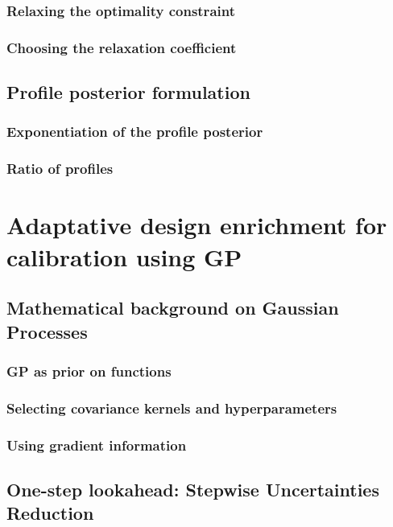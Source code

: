 \documentclass[11pt]{article}
\begin{document}
\subsubsection{Relaxing the optimality constraint}
\label{sec:orge09cf05}
\subsubsection{Choosing the relaxation coefficient}
\label{sec:orgfc77c5f}

\subsection{Profile posterior formulation}
\label{sec:org9fccbb2}
\subsubsection{Exponentiation of the profile posterior}
\label{sec:orgdcc5113}
\subsubsection{Ratio of profiles}
\label{sec:org2e4a526}
\section{Adaptative design enrichment for calibration using GP}
\label{sec:org09af0c3}
\subsection{Mathematical background on Gaussian Processes}
\label{sec:org7fa1013}
\subsubsection{GP as prior on functions}
\label{sec:org5c6ac6a}
\subsubsection{Selecting covariance kernels and hyperparameters}
\label{sec:org87388f5}
\subsubsection{Using gradient information}
\label{sec:orgef0a7bd}
\subsection{One-step lookahead: Stepwise Uncertainties Reduction}
\label{sec:orgaf38846}
\end{document}
